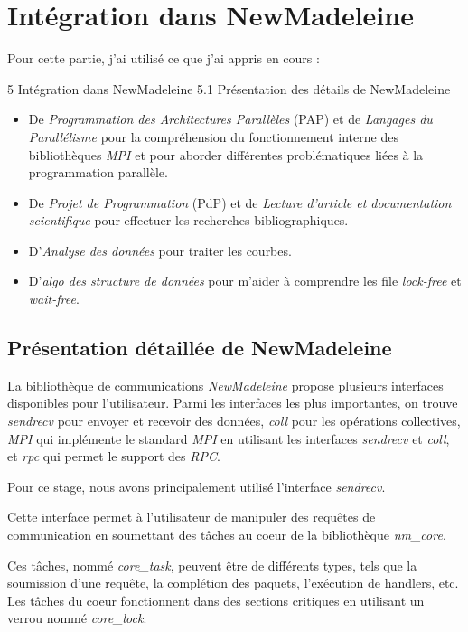 \section{Intégration dans NewMadeleine}

Pour cette partie, j'ai utilisé ce que j'ai appris en cours :

5 Intégration dans NewMadeleine
5.1 Présentation des détails de NewMadeleine

\begin{itemize}
  \item De \emph{Programmation des Architectures Parallèles} (PAP) et de \emph{Langages du Parallélisme} pour la compréhension du fonctionnement interne des bibliothèques \emph{MPI} et pour aborder différentes problématiques liées à la programmation parallèle.
  \item De \emph{Projet de Programmation} (PdP) et de \emph{Lecture d'article et documentation scientifique} pour effectuer les recherches bibliographiques.
  \item D'\emph{Analyse des données} pour traiter les courbes.
  \item D'\emph{algo des structure de données} pour m'aider à comprendre les file \emph{lock-free} et \emph{wait-free}.
\end{itemize}

\subsection{Présentation détaillée de NewMadeleine}

La bibliothèque de communications \emph{NewMadeleine} propose plusieurs interfaces disponibles pour l'utilisateur.
Parmi les interfaces les plus importantes, on trouve \emph{sendrecv} pour envoyer et recevoir des données,
\emph{coll} pour les opérations collectives,
\emph{MPI} qui implémente le standard \emph{MPI} en utilisant les interfaces \emph{sendrecv} et \emph{coll},
et \emph{rpc} qui permet le support des \emph{RPC}.


Pour ce stage, nous avons principalement utilisé l'interface \emph{sendrecv}.

Cette interface permet à l'utilisateur de manipuler des requêtes de communication
en soumettant des tâches au coeur de la bibliothèque \emph{nm_core}.

Ces tâches, nommé \emph{core_task}, peuvent être de différents types, tels que la soumission d'une requête,
la complétion des paquets, l'exécution de handlers, etc.
Les tâches du coeur fonctionnent dans des sections critiques en utilisant un verrou nommé \emph{core_lock}.

